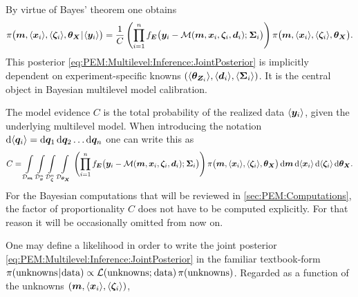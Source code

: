 By virtue of Bayes' theorem one obtains
\begin{equation} \label{eq:PEM:Multilevel:Inference:JointPosterior}
  \pi \big( \bm{m},\langle{\bm{x}_i}\rangle,\langle{\bm{\zeta}_i}\rangle,\bm{\theta}_{\bm{X}} {\:\!}|{\:\!} \langle{\bm{y}_i}\rangle \big)
  = \frac{1}{C} \left( \prod\limits_{i=1}^n f_{\bm{E}} \big( \bm{y}_i-\mathcal{M}(\bm{m},\bm{x}_i,\bm{\zeta}_i,\bm{d}_i) ;{\:\!} \bm{\Sigma}_i \big) \right)
  \pi \big( \bm{m},\langle{\bm{x}_i}\rangle,\langle{\bm{\zeta}_i}\rangle,\bm{\theta}_{\bm{X}} \big).
\end{equation}
This posterior \cref{eq:PEM:Multilevel:Inference:JointPosterior} is implicitly dependent on experiment-specific knowns \((\langle{\bm{\theta}_{\bm{Z}_i}}\rangle,\langle{\bm{d}_i}\rangle,\langle{\bm{\Sigma}_i}\rangle)\).
It is the central object in Bayesian multilevel model calibration.
\par %
The model evidence \(C\) is the total probability of the realized data \(\langle{\bm{y}_i}\rangle\), given the underlying multilevel model.
When introducing the notation \(\mathrm{d} \langle{\bm{q}_i}\rangle = \mathrm{d} \bm{q}_1 \, \mathrm{d} \bm{q}_2 \ldots \mathrm{d} \bm{q}_n\) one can write this as
\begin{equation} \label{eq:PEM:Multilevel:Inference:ScaleFactor}
  C = \int\limits_{\mathcal{D}_{\bm{m}}} \int\limits_{\mathcal{D}_{\bm{x}}^n} \int\limits_{\mathcal{D}_{\bm{\zeta}}^n} \int\limits_{\mathcal{D}_{\bm{\theta}_{\bm{X}}}}
  \left( \prod\limits_{i=1}^n f_{\bm{E}} \big( \bm{y}_i-\mathcal{M}(\bm{m},\bm{x}_i,\bm{\zeta}_i,\bm{d}_i) ;{\:\!} \bm{\Sigma}_i \big) \right)
  \pi \big( \bm{m},\langle{\bm{x}_i}\rangle,\langle{\bm{\zeta}_i}\rangle,\bm{\theta}_{\bm{X}} \big)
  \, \mathrm{d} \bm{m} \, \mathrm{d} \langle{\bm{x}_i}\rangle \, \mathrm{d} \langle{\bm{\zeta}_i}\rangle \, \mathrm{d} \bm{\bm{\theta}_{\bm{X}}}.
\end{equation}
For the Bayesian computations that will be reviewed in \cref{sec:PEM:Computations}, the factor of proportionality \(C\) does not have to be computed explicitly.
For that reason it will be occasionally omitted from now on.
\par %
One may define a likelihood in order to write the joint posterior \cref{eq:PEM:Multilevel:Inference:JointPosterior} in the familiar textbook-form
\(\pi(\text{unknowns} {\:\!}|{\:\!} \text{data}) \propto \mathcal{L}(\text{unknowns} ;{\:\!} \text{data}) \, \pi(\text{unknowns})\).
Regarded as a function of the unknowns \((\bm{m},\langle{\bm{x}_i}\rangle,\langle{\bm{\zeta}_i}\rangle)\),
